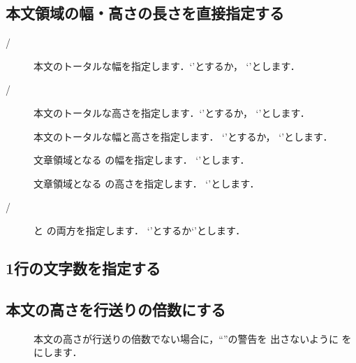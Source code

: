 \subsection{本文領域の幅・高さの長さを直接指定する}
\begin{description}
 \item[/] 
  本文のトータルな幅を指定します．`'とするか，
  `'とします．
 \item[/] 
  本文のトータルな高さを指定します．`'とするか，
  `'とします．
 \item[] 
  本文のトータルな幅と高さを指定します．
  `'とするか，
  `'とします．
 \item[] 
   文章領域となる  の幅を指定します．
   `'とします．
 \item[]
   文章領域となる  の高さを指定します．
   `'とします．
 \item[/]
   と  の両方を指定します．
  `'とするか`'とします．
\end{description}



\subsection{1行の文字数を指定する}
\begin{usage}
\geometry{textwidth=$\<文字数>$zw}
\end{usage}

\subsection{本文の高さを行送りの倍数にする}


\begin{description}
  \item[]
  本文の高さが行送りの倍数でない場合に，``''の警告を
  出さないように  を  にします．
\end{description}

